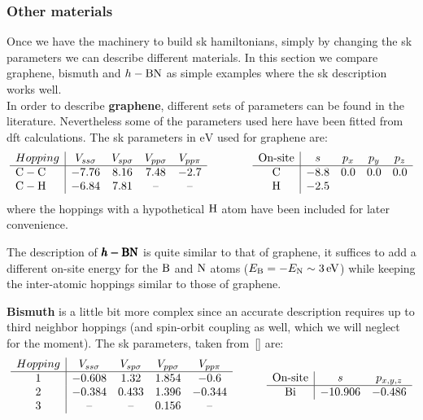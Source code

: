 \subsubsection{Other materials}
Once we have the machinery to build \ac{sk} hamiltonians, simply by changing the \ac{sk} parameters we can describe different materials.
In this section we compare graphene, bismuth and $h-\ce{BN}$  %
as simple examples where the \ac{sk} description works well.\\

%
%
In order to describe \textbf{graphene}, different sets of parameters can be found in the literature\cite{Gosalbez-Martinez2011, Konschuh2010, Saito1998}. Nevertheless some of the parameters used here have been fitted from \ac{dft} calculations. The \ac{sk} parameters in $\si{\eV}$ used for graphene are:
\begin{equation}
  \begin{array}{l|cccc}
    Hopping & V_{ss\sigma} & V_{sp\sigma} & V_{pp\sigma} & V_{pp\pi} \\ \hline
    \ce{C}-\ce{C} & -7.76 & 8.16 & 7.48 & -2.7 \\
    \ce{C}-\ce{H} & -6.84 & 7.81 & \text{--} & \text{--}
  \end{array}\qquad\qquad
  \begin{array}{c|cccc}
    \text{On-site} & s & p_x & p_y & p_z \\ \hline
    \ce{C} & -8.8 & 0.0 & 0.0 & 0.0 \\
    \ce{H} & -2.5 &     &     &
  \end{array}
\label{G_SK_params}
\end{equation}
where the hoppings with a hypothetical $\ce{H}$ atom have been included for later convenience.
\medbreak

The description of $\pmb{h-\ce{BN}}$ is quite similar to that of graphene, it suffices to add a different on-site energy for the $\ce{B}$ and $\ce{N}$ atoms ($E_{\ce{B}} = -E_{\ce{N}}\sim\SI{3}{\eV}$) while keeping the inter-atomic hoppings similar to those of graphene\cite{Watanabe2004}.
\medbreak

\textbf{Bismuth} is a little bit more complex since an accurate description requires up to third neighbor hoppings (and spin-orbit coupling as well, which we will neglect for the moment). The \ac{sk} parameters, taken from~[] are:
\begin{equation}
  \begin{array}{c|cccc}
    Hopping & V_{ss\sigma} & V_{sp\sigma} & V_{pp\sigma} & V_{pp\pi} \\ \hline
    1 & -0.608 & 1.32 & 1.854 & -0.6 \\
    2 & -0.384 & 0.433 & 1.396 & -0.344 \\
    3 & \text{--} & \text{--} & 0.156 & \text{--}
  \end{array}\quad\qquad
  \begin{array}{c|cc}
     \text{On-site} & s & p_{x,y,z} \\ \hline
    \ce{Bi} & -10.906 & -0.486
  \end{array}
\label{Bi_SK_params}
\end{equation}
\medbreak

